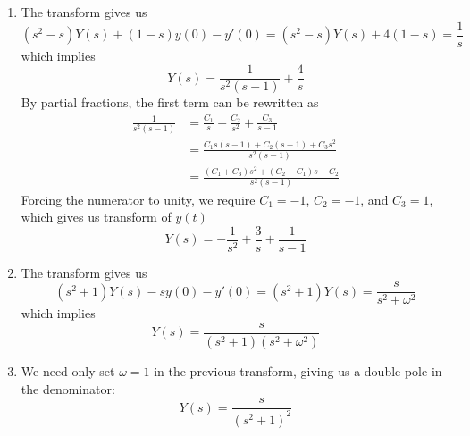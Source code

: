 \documentclass[a4paper]{article}
\begin{document}

\begin{enumerate}[label=(\alph*)]
	\item The transform gives us
	\[ 
		\!\left( s^{2} - s  \right)Y \!\left( s  \right) + \!\left( 1 - s  \right)y \!\left( 0 \right) - y'\!\left( 0 \right) = \!\left( s^{2} - s  \right)Y \!\left( s  \right) + 4 \!\left( 1 - s  \right) = \frac{1}{s}
	\]
	which implies
	\[
		Y \!\left( s  \right) = \frac{1}{s^{2}\!\left( s - 1 \right)} + \frac{4}{s} 
	\]
	By partial fractions, the first term can be rewritten as 
	\begin{align*}
		\frac{1}{s^{2}\!\left( s - 1 \right)} & = \frac{C_{1}}{s } + \frac{C_{2}}{s^{2}} + \frac{C_{3}}{s - 1} \\
		 & = \frac{C_{1} s \!\left( s - 1 \right) + C_{2}\!\left( s - 1 \right) + C_{3}s^{2}}{s^{2}\!\left( s - 1 \right)} \\
		 & = \frac{\!\left( C_{1} + C_{3} \right)s^{2} + \!\left( C_{2} - C_{1} \right)s - C_{2}}{s^{2}\!\left( s - 1 \right)}
	\end{align*}
	Forcing the numerator to unity, we require \( C_{1} = -1 \), \( C_{2} = -1 \), and \( C_{3} = 1 \), which gives us transform of \( y \!\left( t  \right) \)
	\[
		Y \!\left( s  \right) = -\frac{1}{s^{2}} + \frac{3}{s } + \frac{1}{s - 1} 
	\]
	\item The transform gives us
	\[
		\!\left( s^{2} + 1 \right)Y \!\left( s  \right) - sy \!\left( 0 \right) - y'\!\left( 0 \right) = \!\left( s^{2} + 1 \right)Y \!\left( s  \right) =  \frac{s }{s^{2} + \omega^{2}} 
	\]
	which implies
	\[
		Y \!\left( s  \right) = \frac{s}{\!\left( s^{2} + 1 \right)\!\left( s^{2} + \omega^{2} \right)}
	\]
        \item We need only set \( \omega = 1 \) in the previous transform, giving us a double pole in the denominator:
	\[
		Y \!\left( s  \right) = \frac{s }{\!\left( s^{2} + 1 \right)^{2}} 
	\]
\end{enumerate}
\end{document}
